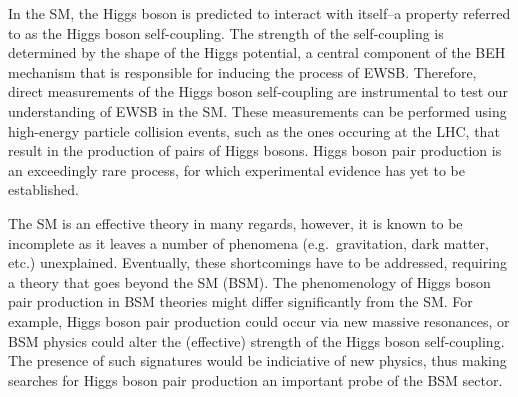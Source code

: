 
In the SM, the Higgs boson is predicted to interact with itself--a property
referred to as the Higgs boson self-coupling. The strength of the self-coupling
is determined by the shape of the Higgs potential, a central component of the
BEH mechanism that is responsible for inducing the process of EWSB.
Therefore, direct measurements of the Higgs boson self-coupling are instrumental
to test our understanding of EWSB in the SM. These measurements can be performed
using high-energy particle collision events, such as the ones occuring at the
LHC, that result in the production of pairs of Higgs bosons. Higgs boson pair
production is an exceedingly rare process, for which experimental evidence has
yet to be established.

%
%
The SM is an effective theory in many regards, however, it is known to be
incomplete as it leaves a number of phenomena (e.g.\ gravitation, dark matter,
etc.) unexplained. Eventually, these shortcomings have to be addressed,
requiring a theory that goes beyond the SM (BSM). The phenomenology of Higgs
boson pair production in BSM theories might differ significantly from the SM.
For example, Higgs boson pair production could occur via new massive resonances,
or BSM physics could alter the (effective) strength of the Higgs boson
self-coupling. The presence of such signatures would be indiciative of new
physics, thus making searches for Higgs boson pair production an important probe
of the BSM sector.


